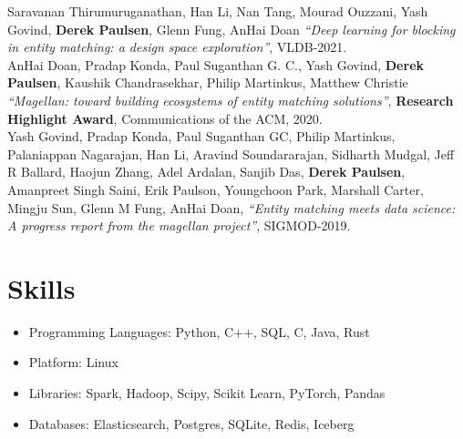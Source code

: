 \documentclass{resume}
\begin{document}
Saravanan Thirumuruganathan, Han Li, Nan Tang, Mourad Ouzzani, Yash Govind, \textbf{Derek Paulsen}, Glenn Fung, AnHai Doan
\textit{``Deep learning for blocking in entity matching: a design space exploration''},
VLDB-2021.\\

AnHai Doan, Pradap Konda, Paul Suganthan G. C., Yash Govind, \textbf{Derek Paulsen}, Kaushik Chandrasekhar, Philip Martinkus, Matthew Christie
\textit{``Magellan: toward building ecosystems of entity matching solutions''}, {\bf Research Highlight Award}, 
Communications of the ACM, 2020.\\

Yash Govind, Pradap Konda, Paul Suganthan GC, Philip Martinkus, Palaniappan Nagarajan, Han Li, Aravind Soundararajan, Sidharth Mudgal, Jeff R Ballard, Haojun Zhang, Adel Ardalan, Sanjib Das, \textbf{Derek Paulsen}, Amanpreet Singh Saini, Erik Paulson, Youngchoon Park, Marshall Carter, Mingju Sun, Glenn M Fung, AnHai Doan,
\textit{``Entity matching meets data science: A progress report from the magellan project''},
SIGMOD-2019.\\



\section{Skills}
\begin{itemize}[parsep=0.5ex]
	\item Programming Languages: Python, C++, SQL, C, Java, Rust
	\item Platform: Linux
	\item Libraries: Spark, Hadoop, Scipy, Scikit Learn, PyTorch, Pandas
	\item Databases: Elasticsearch, Postgres, SQLite, Redis, Iceberg
\end{itemize}

\end{document}
